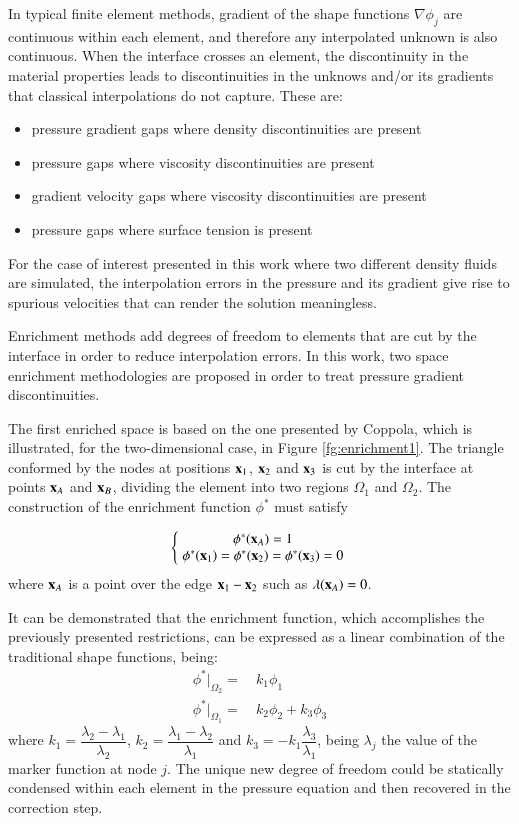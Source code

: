 In typical finite element methods, gradient of the shape functions $\nabla\phi_j$ are continuous within each element, and therefore any interpolated unknown is also continuous. When the interface crosses an element, the discontinuity in the material properties leads to discontinuities in the unknows and/or its gradients that classical interpolations do not capture. These are:
\begin{itemize}
\item pressure gradient gaps where density discontinuities are present\cite{Coppola05}
\item pressure gaps where viscosity discontinuities are present\cite{Idelsohn10}
\item gradient velocity gaps where viscosity discontinuities are present
\item pressure gaps where surface tension is present
\end{itemize}
For the case of interest presented in this work where two different density fluids are simulated, the interpolation errors in the pressure and its gradient give rise to spurious velocities that can render the solution meaningless.

Enrichment methods add degrees of freedom to elements that are cut by the interface in order to reduce interpolation errors. In this work, two space enrichment methodologies are proposed in order to treat pressure gradient discontinuities.

The first enriched space is based on the one presented by Coppola\cite{Coppola05}, which is illustrated, for the two-dimensional case, in Figure \ref{fg:enrichment1}. The triangle conformed by the nodes at positions $\mathbf{x}_1$, $\mathbf{x}_2$ and $\mathbf{x}_3$ is cut by the interface at points $\mathbf{x}_A$ and $\mathbf{x}_B$, dividing the element into two regions $\Omega_1$ and $\Omega_2$. The construction of the enrichment function $\phi^*$ must satisfy

\begin{equation}
   \left\{\;
   \begin{matrix}
      \phi^*(\mathbf{x}_A)= 1 \\
      \phi^*(\mathbf{x}_1)= \phi^*(\mathbf{x}_2)=\phi^*(\mathbf{x}_3)= 0
   \end{matrix}\;
   \right.
   \label{eq:enrich-1a}
\end{equation}
where $\mathbf{x}_A$ is a point over the edge $\mathbf{x}_1-\mathbf{x}_2$ such as $\lambda(\mathbf{x}_A)=0$.

It can be demonstrated \cite{Coppola05} that the enrichment function, which accomplishes the previously presented restrictions, can be expressed as a linear combination of the traditional shape functions, being:
 \begin{align}
    \phi^*|_{\Omega_2} = & \ k_1 \phi_1 \label{phi_enrichment-2}\\
    \phi^*|_{\Omega_1} = & \ k_2 \phi_2 + k_3 \phi_3 \label{phi_enrichment-1}
  \end{align}
where $k_1 = \dfrac{\lambda_2-\lambda_1}{\lambda_2}$, $k_2 = \dfrac{\lambda_1-\lambda_2}{\lambda_1}$ and $k_3 = -k_1\dfrac{\lambda_3}{\lambda_1}$, being $\lambda_j$ the value of the marker function at node $j$. The unique new degree of freedom could be statically condensed within each element in the pressure equation and then recovered in the correction step.

